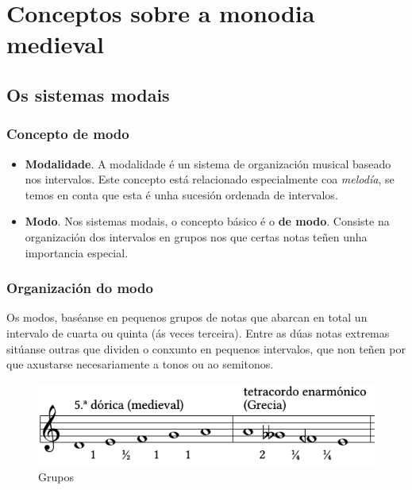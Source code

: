 \documentclass[a4paper, twoside]{templates/ociamthesis}
\begin{document}
\hypertarget{conceptos-sobre-a-monodia-medieval}{%
\chapter{Conceptos sobre a monodia medieval}\label{conceptos-sobre-a-monodia-medieval}}

\minitoc 

\hypertarget{os-sistemas-modais}{%
\section{Os sistemas modais}\label{os-sistemas-modais}}

\hypertarget{concepto-de-modo}{%
\subsection{Concepto de modo}\label{concepto-de-modo}}

\begin{itemize}
\item
  \textbf{Modalidade}. A modalidade é un sistema de organización musical baseado nos intervalos. Este concepto está relacionado especialmente coa \emph{melodía}, se temos en conta que esta é unha sucesión ordenada de intervalos.
\item
  \textbf{Modo}. Nos sistemas modais, o concepto básico é o \textbf{de modo}. Consiste na organización dos intervalos en grupos nos que certas notas teñen unha importancia especial.
\end{itemize}

\hypertarget{organizaciuxf3n-do-modo}{%
\subsection{Organización do modo}\label{organizaciuxf3n-do-modo}}

Os modos, baséanse en pequenos grupos de notas que abarcan en total un intervalo de cuarta ou quinta (ás veces terceira). Entre as dúas notas extremas sitúanse outras que dividen o conxunto en pequenos intervalos, que non teñen por que axustarse necesariamente a tonos ou ao semitonos.

\begin{figure}
\centering
\includegraphics{figures/ud-03/grupos.png}
\caption{Grupos}
\end{figure}
\end{document}
